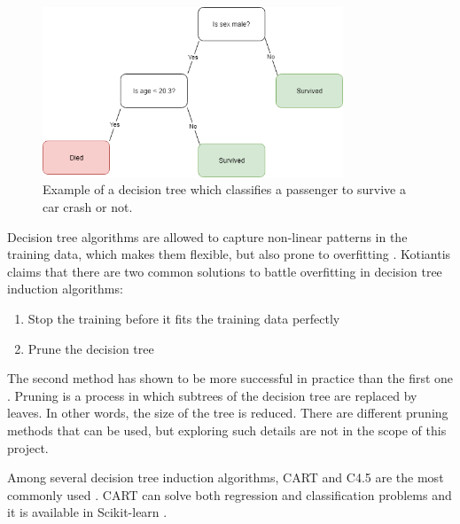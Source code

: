 \begin{figure}[H] 
	\centering
	\includegraphics[width=0.8\textwidth]{media/decisiontree_example.png}
	\caption{Example of a decision tree which classifies a passenger to survive a car crash or not.}
	\label{fig:decisiontree_example}
\end{figure}

		Decision tree algorithms are allowed to capture non-linear patterns in the training data, which makes them flexible, but also prone to overfitting \cite{BOOK:7}. Kotiantis \cite{ARTICLE:7} claims that there are two common solutions to battle overfitting in decision tree induction algorithms:
		\begin{enumerate}
			\item Stop the training before it fits the training data perfectly
			\item Prune the decision tree
		\end{enumerate}
		The second method has shown to be more successful in practice than the first one \cite{BOOK:8}. Pruning is a process in which subtrees of the decision tree are replaced by leaves. In other words, the size of the tree is reduced. There are different pruning methods that can be used, but exploring such details are not in the scope of this project.

		 Among several decision tree induction algorithms, CART and C4.5 are the most commonly used \cite{BOOK:8}. CART can solve both regression and classification problems and it is available in Scikit-learn \cite{WEBSITE:16}. %
		
